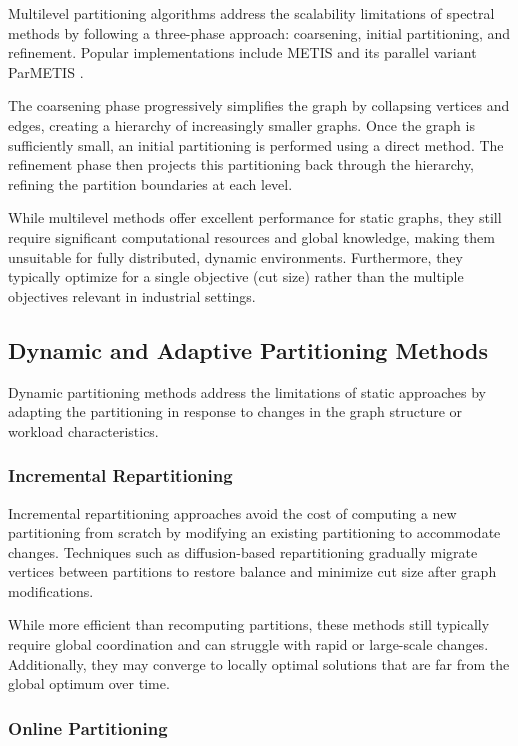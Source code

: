 \documentclass{article}
\begin{document}
Multilevel partitioning algorithms address the scalability limitations of spectral methods by following a three-phase approach: coarsening, initial partitioning, and refinement. Popular implementations include METIS \cite{karypis1998fast} and its parallel variant ParMETIS \cite{karypis1998parallel}.

The coarsening phase progressively simplifies the graph by collapsing vertices and edges, creating a hierarchy of increasingly smaller graphs. Once the graph is sufficiently small, an initial partitioning is performed using a direct method. The refinement phase then projects this partitioning back through the hierarchy, refining the partition boundaries at each level.

While multilevel methods offer excellent performance for static graphs, they still require significant computational resources and global knowledge, making them unsuitable for fully distributed, dynamic environments. Furthermore, they typically optimize for a single objective (cut size) rather than the multiple objectives relevant in industrial settings.

\subsection{Dynamic and Adaptive Partitioning Methods}

Dynamic partitioning methods address the limitations of static approaches by adapting the partitioning in response to changes in the graph structure or workload characteristics.

\subsubsection{Incremental Repartitioning}

Incremental repartitioning approaches avoid the cost of computing a new partitioning from scratch by modifying an existing partitioning to accommodate changes. Techniques such as diffusion-based repartitioning \cite{schloegel2000graph} gradually migrate vertices between partitions to restore balance and minimize cut size after graph modifications.

While more efficient than recomputing partitions, these methods still typically require global coordination and can struggle with rapid or large-scale changes. Additionally, they may converge to locally optimal solutions that are far from the global optimum over time.

\subsubsection{Online Partitioning}
\end{document}
